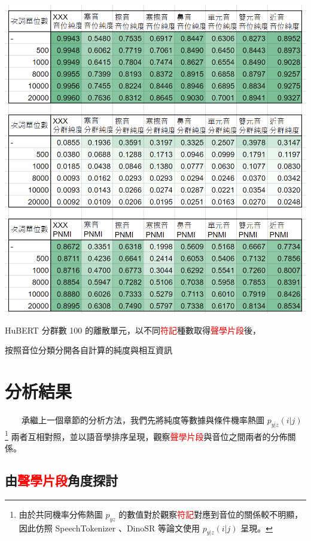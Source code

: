 {        \begin{table}
            \centering
            \includegraphics[width=1\linewidth]{figures/ch4figs/hub100-ap-detailedpur.png}
            \caption{HuBERT 分群數 100 的離散單元，以不同\textcolor{red}{符記}種數取得\textcolor{red}{聲學片段}後，}
            按照音位分類分開各自計算的純度與相互資訊
            \label{fig:hub100-ap-detailedpur}
        \end{table}
    }


\section{分析結果} 

　　承繼上一個章節的分析方法，我們先將純度等數據與條件機率熱圖 $p_{y|z}(i | j)$ \footnote{由於共同機率分佈熱圖 $p_{yz}$ 的數值對於觀察\textcolor{red}{符記}對應到音位的關係較不明顯，因此仿照 SpeechTokenizer \cite{zhang2024speechtokenizer}、DinoSR \cite{liu2024dinosr} 等論文使用 $p_{y|z}(i | j)$ 呈現。} 兩者互相對照，並以語音學排序呈現，觀察\textcolor{red}{聲學片段}與音位之間兩者的分佈關係。

\subsection{由\textcolor{red}{聲學片段}角度探討}

